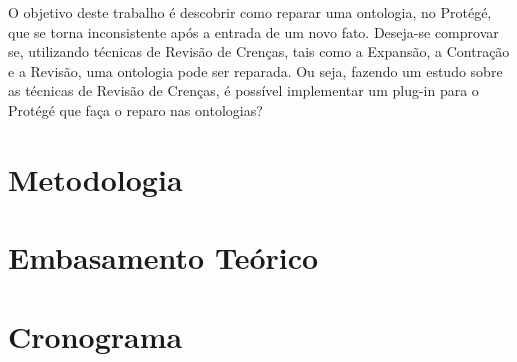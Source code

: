 \documentclass[12pt,letterpaper]{article}
\begin{document}
	O objetivo deste trabalho é descobrir como reparar uma ontologia, no Protégé, que se torna inconsistente após a entrada de um novo fato. Deseja-se comprovar se, utilizando técnicas de Revisão de Crenças, tais como a Expansão, a Contração e a Revisão, uma ontologia pode ser reparada. Ou seja, fazendo um estudo sobre as técnicas de Revisão de Crenças, é possível implementar um plug-in para o Protégé que faça o reparo nas ontologias? \\
	
	\clearpage
	
	\section{Metodologia}
	
	\section{Embasamento Teórico}
	
	\section{Cronograma}
	 
\end{document}
